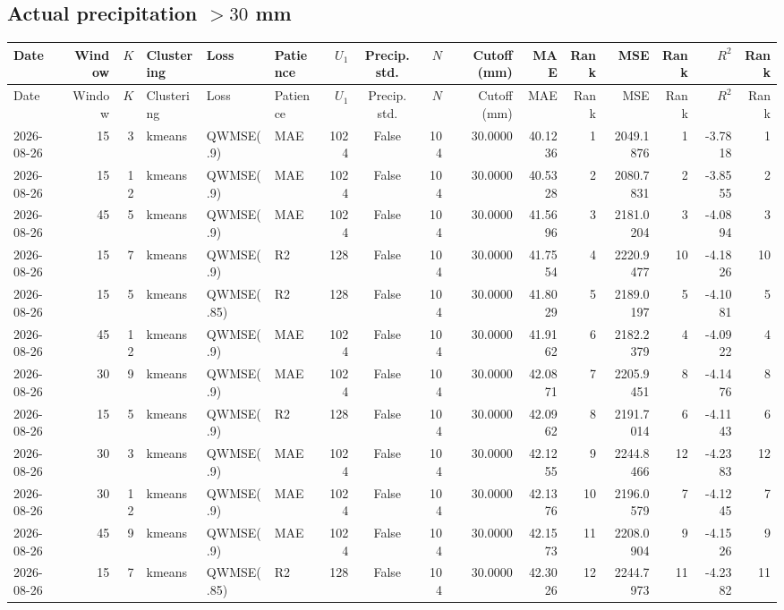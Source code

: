 \documentclass[10pt]{article}
\begin{document}
\begin{landscape}
\subsection*{Actual precipitation $>30$ mm}
\footnotesize
\setlength{\tabcolsep}{3pt}
\begin{longtable}{@{}lrrlllrcrrrrrrrr@{}}
\toprule
Date & Window & $K$ & Clustering & Loss & Patience & $U_1$ & Precip. std. & $N$ & Cutoff (mm) & MAE & Rank & MSE & Rank & $R^2$ & Rank \\
\midrule
\endfirsthead
\toprule
Date & Window & $K$ & Clustering & Loss & Patience & $U_1$ & Precip. std. & $N$ & Cutoff (mm) & MAE & Rank & MSE & Rank & $R^2$ & Rank \\
\midrule
\endhead
2026-08-26 & 15 & 3 & kmeans & QWMSE(.9) & MAE & 1024 & False & 104 & 30.0000 & 40.1236 & 1 & 2049.1876 & 1 & -3.7818 & 1 \\
2026-08-26 & 15 & 12 & kmeans & QWMSE(.9) & MAE & 1024 & False & 104 & 30.0000 & 40.5328 & 2 & 2080.7831 & 2 & -3.8555 & 2 \\
2026-08-26 & 45 & 5 & kmeans & QWMSE(.9) & MAE & 1024 & False & 104 & 30.0000 & 41.5696 & 3 & 2181.0204 & 3 & -4.0894 & 3 \\
2026-08-26 & 15 & 7 & kmeans & QWMSE(.9) & R2 & 128 & False & 104 & 30.0000 & 41.7554 & 4 & 2220.9477 & 10 & -4.1826 & 10 \\
2026-08-26 & 15 & 5 & kmeans & QWMSE(.85) & R2 & 128 & False & 104 & 30.0000 & 41.8029 & 5 & 2189.0197 & 5 & -4.1081 & 5 \\
2026-08-26 & 45 & 12 & kmeans & QWMSE(.9) & MAE & 1024 & False & 104 & 30.0000 & 41.9162 & 6 & 2182.2379 & 4 & -4.0922 & 4 \\
2026-08-26 & 30 & 9 & kmeans & QWMSE(.9) & MAE & 1024 & False & 104 & 30.0000 & 42.0871 & 7 & 2205.9451 & 8 & -4.1476 & 8 \\
2026-08-26 & 15 & 5 & kmeans & QWMSE(.9) & R2 & 128 & False & 104 & 30.0000 & 42.0962 & 8 & 2191.7014 & 6 & -4.1143 & 6 \\
2026-08-26 & 30 & 3 & kmeans & QWMSE(.9) & MAE & 1024 & False & 104 & 30.0000 & 42.1255 & 9 & 2244.8466 & 12 & -4.2383 & 12 \\
2026-08-26 & 30 & 12 & kmeans & QWMSE(.9) & MAE & 1024 & False & 104 & 30.0000 & 42.1376 & 10 & 2196.0579 & 7 & -4.1245 & 7 \\
2026-08-26 & 45 & 9 & kmeans & QWMSE(.9) & MAE & 1024 & False & 104 & 30.0000 & 42.1573 & 11 & 2208.0904 & 9 & -4.1526 & 9 \\
2026-08-26 & 15 & 7 & kmeans & QWMSE(.85) & R2 & 128 & False & 104 & 30.0000 & 42.3026 & 12 & 2244.7973 & 11 & -4.2382 & 11 \\

\end{longtable}
\end{landscape}
\end{document}
